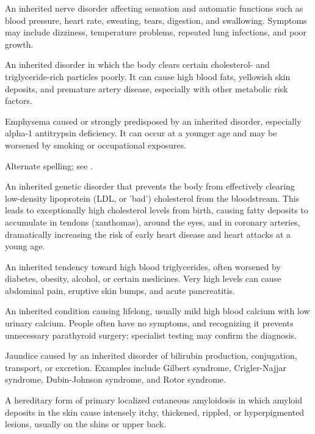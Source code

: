  An inherited nerve disorder affecting sensation and automatic functions such as blood pressure, heart rate, sweating, tears, digestion, and swallowing. Symptoms may include dizziness, temperature problems, repeated lung infections, and poor growth.

 An inherited disorder in which the body clears certain cholesterol- and triglyceride-rich particles poorly. It can cause high blood fats, yellowish skin deposits, and premature artery disease, especially with other metabolic risk factors.

 Emphysema caused or strongly predisposed by an inherited disorder, especially alpha-1 antitrypsin deficiency. It can occur at a younger age and may be worsened by smoking or occupational exposures.

 Alternate spelling; see .

 An inherited genetic disorder that prevents the body from effectively clearing low-density lipoprotein (LDL, or 'bad') cholesterol from the bloodstream. This leads to exceptionally high cholesterol levels from birth, causing fatty deposits to accumulate in tendons (xanthomas), around the eyes, and in coronary arteries, dramatically increasing the risk of early heart disease and heart attacks at a young age.

 An inherited tendency toward high blood triglycerides, often worsened by diabetes, obesity, alcohol, or certain medicines. Very high levels can cause abdominal pain, eruptive skin bumps, and acute pancreatitis.

 An inherited condition causing lifelong, usually mild high blood calcium with low urinary calcium. People often have no symptoms, and recognizing it prevents unnecessary parathyroid surgery; specialist testing may confirm the diagnosis.

 Jaundice caused by an inherited disorder of bilirubin production, conjugation, transport, or excretion. Examples include Gilbert syndrome, Crigler-Najjar syndrome, Dubin-Johnson syndrome, and Rotor syndrome.

 A hereditary form of primary localized cutaneous amyloidosis in which amyloid deposits in the skin cause intensely itchy, thickened, rippled, or hyperpigmented lesions, usually on the shins or upper back.

